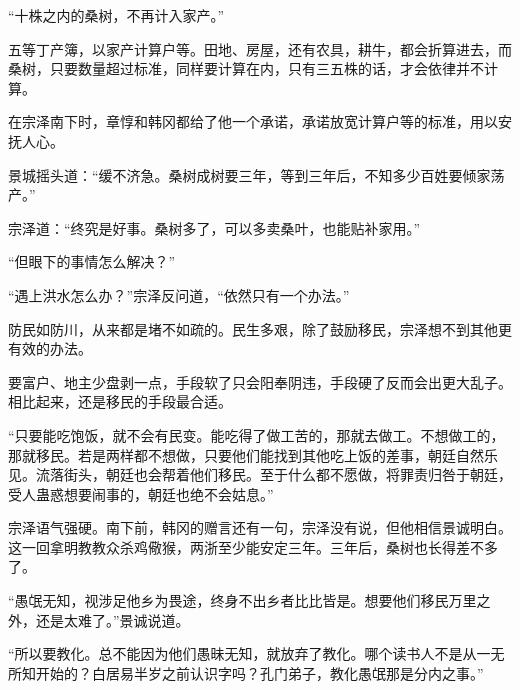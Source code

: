“十株之内的桑树，不再计入家产。”

五等丁产簿，以家产计算户等。田地、房屋，还有农具，耕牛，都会折算进去，而桑树，只要数量超过标准，同样要计算在内，只有三五株的话，才会依律并不计算。

在宗泽南下时，章惇和韩冈都给了他一个承诺，承诺放宽计算户等的标准，用以安抚人心。

景城摇头道：“缓不济急。桑树成树要三年，等到三年后，不知多少百姓要倾家荡产。”

宗泽道：“终究是好事。桑树多了，可以多卖桑叶，也能贴补家用。”

“但眼下的事情怎么解决？”

“遇上洪水怎么办？”宗泽反问道，“依然只有一个办法。”

防民如防川，从来都是堵不如疏的。民生多艰，除了鼓励移民，宗泽想不到其他更有效的办法。

要富户、地主少盘剥一点，手段软了只会阳奉阴违，手段硬了反而会出更大乱子。相比起来，还是移民的手段最合适。

“只要能吃饱饭，就不会有民变。能吃得了做工苦的，那就去做工。不想做工的，那就移民。若是两样都不想做，只要他们能找到其他吃上饭的差事，朝廷自然乐见。流落街头，朝廷也会帮着他们移民。至于什么都不愿做，将罪责归咎于朝廷，受人蛊惑想要闹事的，朝廷也绝不会姑息。”

宗泽语气强硬。南下前，韩冈的赠言还有一句，宗泽没有说，但他相信景诚明白。这一回拿明教教众杀鸡儆猴，两浙至少能安定三年。三年后，桑树也长得差不多了。

“愚氓无知，视涉足他乡为畏途，终身不出乡者比比皆是。想要他们移民万里之外，还是太难了。”景诚说道。

“所以要教化。总不能因为他们愚昧无知，就放弃了教化。哪个读书人不是从一无所知开始的？白居易半岁之前认识字吗？孔门弟子，教化愚氓那是分内之事。”
